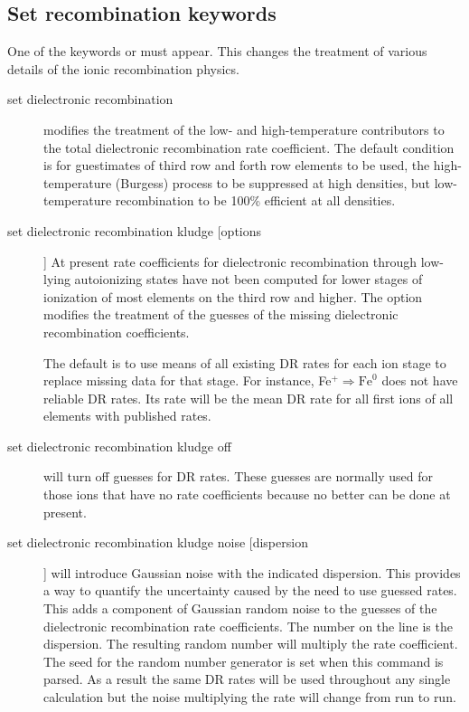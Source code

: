\subsection{Set recombination keywords}

One of the keywords  or 
must appear.
This changes
the treatment of various details of the ionic recombination physics.

\begin{description}
\item[set dielectronic recombination]
modifies the treatment of
the low- and high-temperature contributors to the total dielectronic
recombination rate coefficient.
The default condition is for guestimates
of third row and forth row elements to be used,
the high-temperature
(Burgess) process to be suppressed at high densities,
but low-temperature
recombination to be 100\% efficient at all densities.

\item[set dielectronic recombination kludge [options]]
At present rate
coefficients for dielectronic recombination through low-lying autoionizing
states have not been computed for lower stages of ionization of most
elements on the third row and higher.
The  option modifies the treatment
of the guesses of the missing dielectronic recombination coefficients.

The default is to use means of all existing DR rates for each ion stage
to replace missing data for that stage.
For instance, Fe$^+ \Rightarrow \mathrm{Fe}^0$ does not
have reliable DR rates.
Its rate will be the mean DR rate for all first
ions of all elements with published rates.

\item[set dielectronic recombination kludge off]
will turn off guesses for DR rates.
These guesses are normally used for those ions that
have no rate coefficients because no better can be done at present.

\item[set dielectronic recombination kludge noise [dispersion]]
will introduce Gaussian noise with the indicated dispersion.
This provides
a way to quantify the uncertainty caused by the need to use guessed rates.
This adds a component of Gaussian random noise to the guesses of the
dielectronic recombination rate coefficients.
The number on the line is
the dispersion.
The resulting random number will multiply the rate
coefficient.
The seed for the random number generator is set when this
command is parsed.
As a result the same DR rates will be used throughout
any single calculation but the noise multiplying the rate will change from
run to run.


\end{description}
